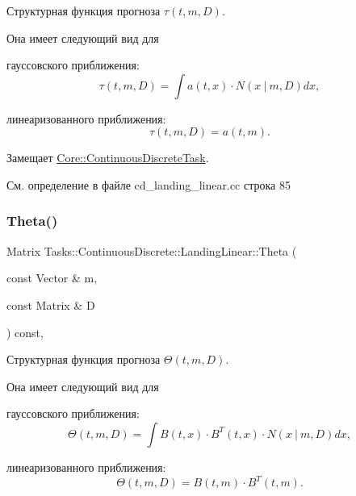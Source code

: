 Структурная функция прогноза $\tau(t, m, D)$. 

Она имеет следующий вид для


\begin{DoxyItemize}
\item гауссовского приближения\+: \[\tau(t, m, D) = \int a(t,x)\cdot N(x\ |\ m, D)dx,\]
\item линеаризованного приближения\+: \[\tau(t, m, D) = a(t, m).\] 
\end{DoxyItemize}

Замещает \hyperlink{class_core_1_1_continuous_discrete_task_a491a9dc4463031a6f5f2eeda24d8ba9c}{Core\+::\+Continuous\+Discrete\+Task}.



См. определение в файле cd\+\_\+landing\+\_\+linear.\+cc строка 85

\hypertarget{class_tasks_1_1_continuous_discrete_1_1_landing_linear_a783147d41d5d8dff4facd246fc064bb4}{}\label{class_tasks_1_1_continuous_discrete_1_1_landing_linear_a783147d41d5d8dff4facd246fc064bb4} 
\subsubsection{\texorpdfstring{Theta()}{Theta()}}
{\footnotesize\ttfamily Matrix Tasks\+::\+Continuous\+Discrete\+::\+Landing\+Linear\+::\+Theta (\begin{DoxyParamCaption}\item[{const Vector \&}]{m,  }\item[{const Matrix \&}]{D }\end{DoxyParamCaption}) const\hspace{0.3cm}{\ttfamily [override]}, {\ttfamily [virtual]}}



Структурная функция прогноза $\Theta(t,m,D)$. 

Она имеет следующий вид для


\begin{DoxyItemize}
\item гауссовского приближения\+: \[\Theta(t,m,D) = \int B(t,x)\cdot B^T(t,x)\cdot N(x\ |\ m,D)dx,\]
\item линеаризованного приближения\+: \[\Theta(t,m,D) = B(t,m)\cdot B^T(t,m).\] 
\end{DoxyItemize}

